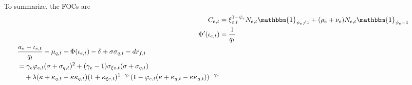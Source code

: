\documentclass[12 pt, oneside]{article}
\theoremstyle{definition}
\theoremstyle{definition}
\theoremstyle{definition}
\begin{document}
To summarize, the FOCs are
\begin{align}
  \label{eq:consumption FOC}
C_{e, t} & = \xi_{e, t}^{1 - \psi_e}N_{e, t} \mathbbm{1}_{\psi_e \neq 1} + (\rho_e + \nu_e)N_{e, t}\mathbbm{1}_{\psi_e = 1}\\
\label{eq:internal investment FOC}
\Phi'(\iota_{e, t}) & = \frac{1}{q_t}\\
\label{eq:leverage FOC}
  \begin{split}
    & \frac{a_e - \iota_{e, t}}{q_t} + \mu_{q, t} + \Phi(\iota_{e, t}) - \delta + \sigma\sigma_{q, t} - dr_{f, t}\\
    & = \gamma_e\varphi_{e, t}(\sigma + \sigma_{q, t})^2 + (\gamma_e - 1)\sigma_{\xi e, t}(\sigma + \sigma_{q, t}) \\
    &\quad + \lambda(\kappa + \kappa_{q, t} - \kappa\kappa_{q, t})(1 + \kappa_{\xi e, t})^{1 - \gamma_e}(1 - \varphi_{e, t}(\kappa + \kappa_{q, t} - \kappa\kappa_{q, t}))^{ - \gamma_e}
  \end{split}
\end{align}
\end{document}
